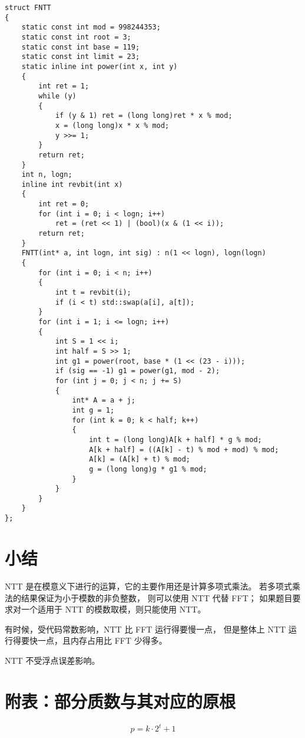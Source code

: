 \documentclass[12pt, UTF8]{article}
\begin{document}
    \lstset{language=C++}
    \begin{lstlisting}
struct FNTT
{
    static const int mod = 998244353;
    static const int root = 3;
    static const int base = 119;
    static const int limit = 23;
    static inline int power(int x, int y)
    {
        int ret = 1;
        while (y)
        {
            if (y & 1) ret = (long long)ret * x % mod;
            x = (long long)x * x % mod;
            y >>= 1;
        }
        return ret;
    }
    int n, logn;
    inline int revbit(int x)
    {
        int ret = 0;
        for (int i = 0; i < logn; i++)
            ret = (ret << 1) | (bool)(x & (1 << i));
        return ret;
    }
    FNTT(int* a, int logn, int sig) : n(1 << logn), logn(logn)
    {
        for (int i = 0; i < n; i++)
        {
            int t = revbit(i);
            if (i < t) std::swap(a[i], a[t]);
        }
        for (int i = 1; i <= logn; i++)
        {
            int S = 1 << i;
            int half = S >> 1;
            int g1 = power(root, base * (1 << (23 - i)));
            if (sig == -1) g1 = power(g1, mod - 2);
            for (int j = 0; j < n; j += S)
            {
                int* A = a + j;
                int g = 1;
                for (int k = 0; k < half; k++)
                {
                    int t = (long long)A[k + half] * g % mod;
                    A[k + half] = ((A[k] - t) % mod + mod) % mod;
                    A[k] = (A[k] + t) % mod;
                    g = (long long)g * g1 % mod;
                }
            }
        }
    }
};
    \end{lstlisting}

    \section{小结}
    NTT 是在模意义下进行的运算，它的主要作用还是计算多项式乘法。
    若多项式乘法的结果保证为小于模数的非负整数，
    则可以使用 NTT 代替 FFT；
    如果题目要求对一个适用于 NTT 的模数取模，则只能使用 NTT。

    有时候，受代码常数影响，NTT 比 FFT 运行得要慢一点，
    但是整体上 NTT 运行得要快一点，且内存占用比 FFT 少得多。

    NTT 不受浮点误差影响。

    \newpage
    \section{附表：部分质数与其对应的原根}
    \begin{equation*}
        p = k · 2^t + 1
    \end{equation*}
\end{document}
